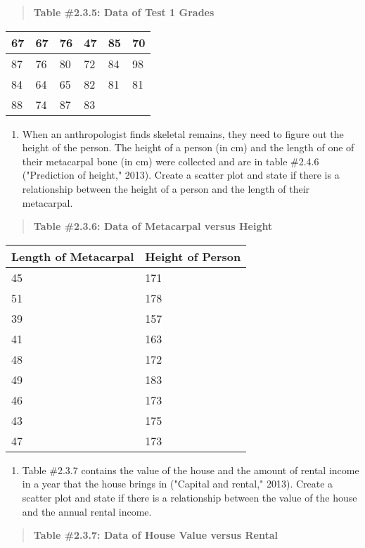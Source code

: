 \documentclass[]{book}
\providecommand{\tightlist}{%
  \setlength{\itemsep}{0pt}\setlength{\parskip}{0pt}}
\begin{document}
\begin{quote}
\textbf{Table \#2.3.5: Data of Test 1 Grades}
\end{quote}

\begin{longtable}[]{@{}llllll@{}}
\toprule
67 & 67 & 76 & 47 & 85 & 70\tabularnewline
\midrule
\endhead
87 & 76 & 80 & 72 & 84 & 98\tabularnewline
84 & 64 & 65 & 82 & 81 & 81\tabularnewline
88 & 74 & 87 & 83 & &\tabularnewline
\bottomrule
\end{longtable}

\begin{enumerate}
\def\labelenumi{\arabic{enumi}.}
\setcounter{enumi}{2}
\tightlist
\item
  When an anthropologist finds skeletal remains, they need to figure
  out the height of the person. The height of a person (in cm) and the
  length of one of their metacarpal bone (in cm) were collected and
  are in table \#2.4.6 ("Prediction of height," 2013). Create a
  scatter plot and state if there is a relationship between the height
  of a person and the length of their metacarpal.
\end{enumerate}

\begin{quote}
\textbf{Table \#2.3.6: Data of Metacarpal versus Height}
\end{quote}

\begin{longtable}[]{@{}ll@{}}
\toprule
Length of Metacarpal & Height of Person\tabularnewline
\midrule
\endhead
45 & 171\tabularnewline
51 & 178\tabularnewline
39 & 157\tabularnewline
41 & 163\tabularnewline
48 & 172\tabularnewline
49 & 183\tabularnewline
46 & 173\tabularnewline
43 & 175\tabularnewline
47 & 173\tabularnewline
\bottomrule
\end{longtable}

\begin{enumerate}
\def\labelenumi{\arabic{enumi}.}
\setcounter{enumi}{3}
\tightlist
\item
  Table \#2.3.7 contains the value of the house and the amount of
  rental income in a year that the house brings in ("Capital and
  rental," 2013). Create a scatter plot and state if there is a
  relationship between the value of the house and the annual rental
  income.
\end{enumerate}

\begin{quote}
\textbf{Table \#2.3.7: Data of House Value versus Rental}
\end{quote}
\end{document}
